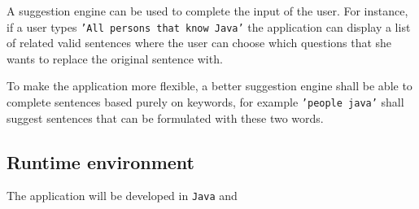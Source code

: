 A suggestion engine can be used to complete the input of the user. For instance, if a user types \texttt{'All persons that know Java'} the application can display a list of related valid sentences where the user can choose which questions that she wants to replace the original sentence with.

To make the application more flexible, a better suggestion engine shall be able to complete sentences based purely on keywords, for example \texttt{'people java'} shall suggest sentences that can be formulated with these two words.

\subsection{Runtime environment}
The application will be developed in \texttt{Java} and 